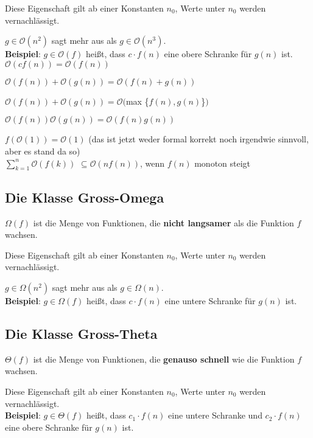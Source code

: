 \documentclass[12pt]{article}
\begin{document}
Diese Eigenschaft gilt ab einer Konstanten $n_0$, Werte unter $n_0$ werden vernachlässigt.

$g \in \mathcal O(n^2)$ sagt mehr aus als $g \in \mathcal O(n^3)$.\\

\textbf{Beispiel}: $g \in \mathcal O(f)$ heißt, dass $c \cdot{} f(n)$ eine obere Schranke für $g(n)$ ist.\\

$\mathcal O(cf(n)) = \mathcal O(f(n))$

$\mathcal O(f(n)) + \mathcal O(g(n)) = \mathcal O(f(n) + g(n))$

$\mathcal O(f(n)) + \mathcal O(g(n)) = \mathcal O($max \{$f(n), g(n)$\}$)$

$\mathcal O(f(n))\mathcal O(g(n)) = \mathcal O(f(n)g(n))$

$f(\mathcal O(1)) = \mathcal O(1)$ (das ist jetzt weder formal korrekt noch irgendwie sinnvoll, aber es stand da so)\\

$\sum_{k=1}^n \mathcal O(f(k))$ $\subseteq \mathcal O(nf(n))$, wenn $f(n)$ monoton steigt

\subsection{Die Klasse Gross-Omega}

$\Omega(f)$ ist die Menge von Funktionen, die \textbf{nicht langsamer} als die Funktion $f$ wachsen.

Diese Eigenschaft gilt ab einer Konstanten $n_0$, Werte unter $n_0$ werden vernachlässigt.

$g \in \Omega(n^2)$ sagt mehr aus als $g \in \Omega(n)$.\\

\textbf{Beispiel}: $g \in \Omega(f)$ heißt, dass $c \cdot{} f(n)$ eine untere Schranke für $g(n)$ ist.\\

\subsection{Die Klasse Gross-Theta}

$\Theta(f)$ ist die Menge von Funktionen, die \textbf{genauso schnell} wie die Funktion $f$ wachsen.

Diese Eigenschaft gilt ab einer Konstanten $n_0$, Werte unter $n_0$ werden vernachlässigt.\\

\textbf{Beispiel}: $g \in \Theta(f)$ heißt, dass $c_1 \cdot{} f(n)$ eine untere Schranke und $c_2 \cdot{} f(n)$ eine obere Schranke für $g(n)$ ist.\\
\end{document}

